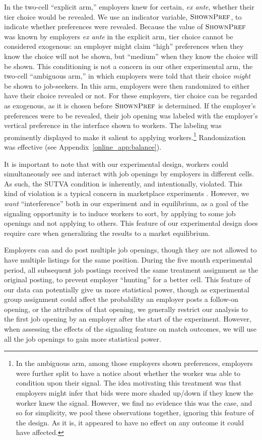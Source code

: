 \documentclass[12pt]{article}
\begin{document}
In the two-cell ``explicit arm,'' employers knew for certain, \emph{ex ante}, whether their tier choice would be revealed.
We use an indicator variable, $\textsc{ShownPref}$, to indicate whether preferences were revealed. 
Because the value of $\textsc{ShownPref}$ was known by employers \emph{ex ante} in the explicit arm, tier choice cannot be considered exogenous: 
an employer might claim ``high'' preferences when they know the choice will not be shown, but ``medium'' when they know the choice will be shown.
This conditioning is not a concern in our other experimental arm, the two-cell  ``ambiguous arm,'' in which employers were told that their choice \emph{might} be shown to job-seekers.
In this arm, employers were then randomized to either have their choice revealed or not. 
For these employers, tier choice can be regarded as exogenous, as it is chosen before $\textsc{ShownPref}$ is determined.
If the employer's preferences were to be revealed, their job opening was labeled with the employer's vertical preference in the interface shown to workers.
The labeling was prominently displayed to make it salient to applying workers.\footnote{
  In the ambiguous arm, among those employers shown preferences, employers were further split to have a notice about whether the worker was able to condition upon their signal.
  The idea motivating this treatment was that employers might infer that bids were more shaded up/down if they knew the worker knew the signal.
  However, we find no evidence this was the case, and so for simplicity, we pool these observations together, ignoring this feature of the design.
  As it is, it appeared to have no effect on any outcome it could have affected. 
}
Randomization was effective (see Appendix~\ref{online_app:balance}). 

It is important to note that with our experimental design, workers could simultaneously see and interact with job openings by employers in different cells. 
As such, the SUTVA condition is inherently, and intentionally, violated.
This kind of violation is a typical concern in marketplace experiments \citep{blake2014marketplace}.
However, we \emph{want} ``interference'' both in our experiment and in equilibrium, as a goal of the signaling opportunity is to induce workers to sort, by applying to some job openings and not applying to others.
This feature of our experimental design does require care when generalizing the results to a market equilibrium.

Employers can and do post multiple job openings, though they are not allowed to have multiple listings for the same position. 
During the five month experimental period, all subsequent job postings received the same treatment assignment as the original posting, to prevent employer ``hunting'' for a better cell.
This feature of our data can potentially give us more statistical power, though as experimental group assignment could affect the probability an employer posts a follow-on opening, or the attributes of that opening, we generally restrict our analysis to the first job opening by an employer after the start of the experiment.  
However, when assessing the effects of the signaling feature on match outcomes, we will use all the job openings to gain more statistical power.
\end{document}
